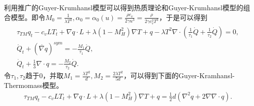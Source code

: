 \documentclass{article}
\begin{document}
利用推广的Guyer-Krumhansl模型可以得到热质理论和Guyer-Krumhansl模型的组合模型。即令$M_0=\frac{1}{\lambda T^2}, \alpha_0 = \alpha_0 (u) =\frac{\rho c_v}{2\gamma u^3}=\frac{\rho}{2\gamma c_v^2 T^3}$，于是可以得到
\begin{eqnarray*}
\tau_{TM} {q}_t-c_v {L}T_t+\nabla {q} \cdot {L}+\lambda(1-M_H^2)\nabla T+{q} - \lambda T^2 \nabla \cdot ({\frac{1}{\tau_1} \mathring{{Q}}}+\frac{1}{\tau_2}\dot{Q})=0, \\
\mathring{{Q}}_t+(\mathring{\nabla {q}})^{sym}=-\frac{M_1}{\tau_1}\mathring{{Q}}, \\
\dot{Q}_t+\frac{1}{3} \nabla \cdot {q}=-\frac{M_2}{\tau_2} \dot{Q}.
\end{eqnarray*}
令$\tau_1,\tau_2$趋于0，并取$M_1 = \frac{\lambda T^2}{d}, M_2 = \frac{2\lambda T^2}{5 d }$，可以得到下面的Guyer-Kramhansl-Thermomass模型。
\begin{eqnarray*}
	\tau_{TM} {q}_t-c_v {L}T_t+\nabla {q} \cdot {L}+\lambda(1-M_H^2)\nabla T+{q} = \frac{1}{2}d (\nabla^2 q +2 \nabla \nabla \cdot q). \\
\end{eqnarray*}
\end{document}
